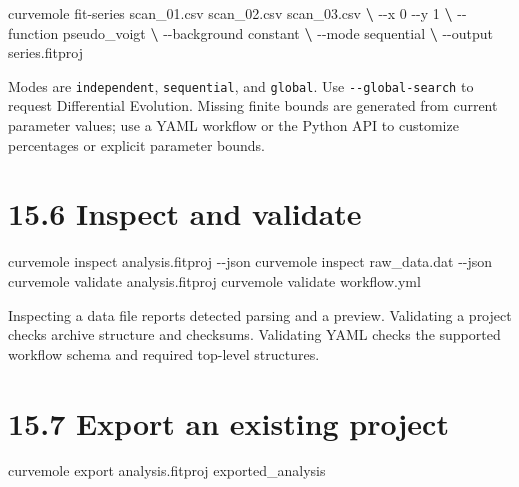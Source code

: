 \documentclass[
  10pt,
  a4paper,
  oneside]{scrreprt}
\newenvironment{Shaded}{}{}
\newcommand{\ExtensionTok}[1]{#1}
\newcommand{\KeywordTok}[1]{\textcolor[rgb]{0.00,0.44,0.13}{\textbf{#1}}}
\newcommand{\NormalTok}[1]{#1}
\begin{document}
\begin{Shaded}
\begin{Highlighting}[]
\ExtensionTok{curvemole}\NormalTok{ fit{-}series scan\_01.csv scan\_02.csv scan\_03.csv }\KeywordTok{\textbackslash{}}
  \ExtensionTok{{-}{-}x}\NormalTok{ 0 {-}{-}y 1 }\KeywordTok{\textbackslash{}}
  \ExtensionTok{{-}{-}function}\NormalTok{ pseudo\_voigt }\KeywordTok{\textbackslash{}}
  \ExtensionTok{{-}{-}background}\NormalTok{ constant }\KeywordTok{\textbackslash{}}
  \ExtensionTok{{-}{-}mode}\NormalTok{ sequential }\KeywordTok{\textbackslash{}}
  \ExtensionTok{{-}{-}output}\NormalTok{ series.fitproj}
\end{Highlighting}
\end{Shaded}

Modes are \texttt{independent}, \texttt{sequential}, and
\texttt{global}. Use \texttt{-\/-global-search} to request Differential
Evolution. Missing finite bounds are generated from current parameter
values; use a YAML workflow or the Python API to customize percentages
or explicit parameter bounds.

\hypertarget{inspect-and-validate}{%
\section{15.6 Inspect and validate}\label{inspect-and-validate}}

\begin{Shaded}
\begin{Highlighting}[]
\ExtensionTok{curvemole}\NormalTok{ inspect analysis.fitproj {-}{-}json}
\ExtensionTok{curvemole}\NormalTok{ inspect raw\_data.dat {-}{-}json}
\ExtensionTok{curvemole}\NormalTok{ validate analysis.fitproj}
\ExtensionTok{curvemole}\NormalTok{ validate workflow.yml}
\end{Highlighting}
\end{Shaded}

Inspecting a data file reports detected parsing and a preview.
Validating a project checks archive structure and checksums. Validating
YAML checks the supported workflow schema and required top-level
structures.

\hypertarget{export-an-existing-project}{%
\section{15.7 Export an existing
project}\label{export-an-existing-project}}

\begin{Shaded}
\begin{Highlighting}[]
\ExtensionTok{curvemole}\NormalTok{ export analysis.fitproj exported\_analysis}
\end{Highlighting}
\end{Shaded}
\end{document}
